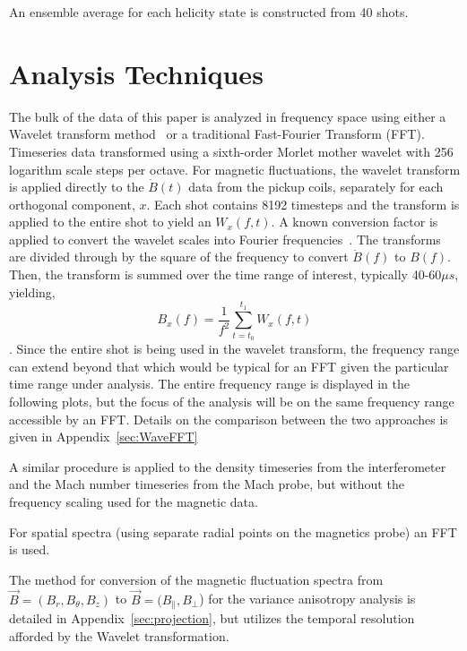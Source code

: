 \documentclass[aip,prl,amsmath,amssymb,reprint,superscriptaddress]{revtex4-1} %
\begin{document}
An ensemble average for each helicity state is constructed from 40 shots.

\section{Analysis Techniques}\label{sec:analysis}

The bulk of the data of this paper is analyzed in frequency space using either a Wavelet transform method~\cite{torrence98} or a traditional Fast-Fourier Transform (FFT). Timeseries data transformed using a sixth-order Morlet mother wavelet with 256 logarithm scale steps per octave. For magnetic fluctuations, the wavelet transform is applied directly to the $\dot{B}(t)$ data from the pickup coils, separately for each orthogonal component, $x$. Each shot contains 8192 timesteps and the transform is applied to the entire shot to yield an $W_{x}(f,t)$. A known conversion factor is applied to convert the wavelet scales into Fourier frequencies~\cite{torrence98}. The transforms are divided through by the square of the frequency to convert $\dot{B}(f)$ to $B(f)$. Then, the transform is summed over the time range of interest, typically 40-60$\mu s$, yielding,
\begin{equation}
B_{x}(f) = \frac{1}{f^{2}}\sum_{t=t_{0}}^{t_{1}} W_{x}(f,t)
\label{eq:wavelet_transform}
\end{equation}.
Since the entire shot is being used in the wavelet transform, the frequency range can extend beyond that which would be typical for an FFT given the particular time range under analysis. The entire frequency range is displayed in the following plots, but the focus of the analysis will be on the same frequency range accessible by an FFT. Details on the comparison between the two approaches is given in Appendix~\ref{sec:WaveFFT}

A similar procedure is applied to the density timeseries from the interferometer and the Mach number timeseries from the Mach probe, but without the frequency scaling used for the magnetic data.

For spatial spectra (using separate radial points on the magnetics probe) an FFT is used.

The method for conversion of the magnetic fluctuation spectra from $\vec{B} = (B_{r},B_{\theta},B_{z})$ to $\vec{B} = (B_{\parallel},B_{\perp}$) for the variance anisotropy analysis is detailed in Appendix~\ref{sec:projection}, but utilizes the temporal resolution afforded by the Wavelet transformation.
\end{document}
